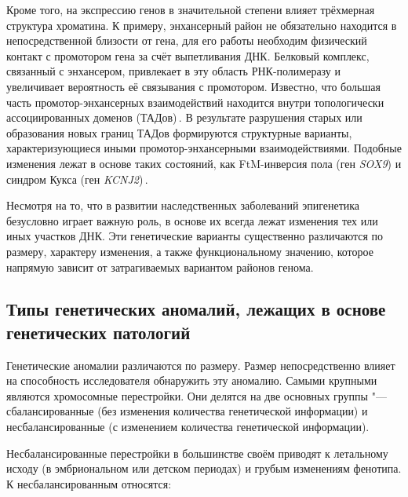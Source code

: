 \documentclass[a4paper,14pt]{extarticle}
\newcommand{\genename}[1]{\textit{#1}}
\begin{document}
Кроме того, на экспрессию генов в значительной степени влияет трёхмерная структура хроматина.
К примеру, энхансерный район не обязательно находится в непосредственной близости от гена, для его работы необходим физический контакт с промотором гена за счёт выпетливания ДНК.
Белковый комплекс, связанный с энхансером, привлекает в эту область РНК-полимеразу и увеличивает вероятность её связывания с промотором.
Известно, что большая часть промотор-энхансерных взаимодействий находится внутри топологически ассоциированных доменов (ТАДов)\,\citep{Rao_2014}.
В результате разрушения старых или образования новых границ ТАДов формируются структурные варианты, характеризующиеся иными промотор-энхансерными взаимодействиями.
Подобные изменения лежат в основе таких состояний, как FtM-инверсия пола (ген \genename{SOX9}) и синдром Кукса (ген \genename{KCNJ2})\,\citep{Spielmann_2018}.

Несмотря на то, что в развитии наследственных заболеваний эпигенетика безусловно играет важную роль, в основе их всегда лежат изменения тех или иных участков ДНК.
Эти генетические варианты существенно различаются по размеру, характеру изменения, а также функциональному значению, которое напрямую зависит от затрагиваемых вариантом районов генома.

\subsection{Типы генетических аномалий, лежащих в основе генетических патологий}

Генетические аномалии различаются по размеру.
Размер непосредственно влияет на способность исследователя обнаружить эту аномалию.
Самыми крупными являются хромосомные перестройки.
Они делятся на две основных группы "--- сбалансированные (без изменения количества генетической информации) и несбалансированные (с изменением количества генетической информации).

Несбалансированные перестройки в большинстве своём приводят к летальному исходу (в эмбриональном или детском периодах) и грубым изменениям фенотипа.
К несбалансированным относятся:
\end{document}
